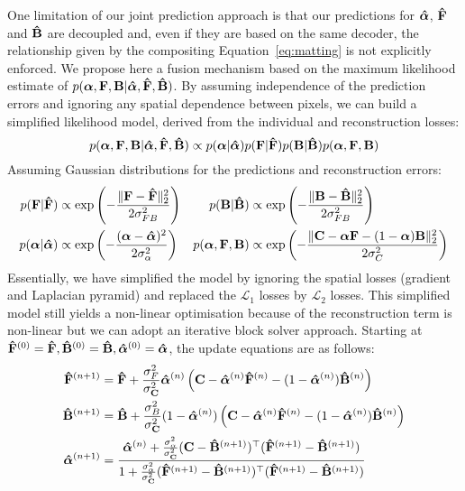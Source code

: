 \documentclass[runningheads]{llncs}
\begin{document}
One limitation of our joint prediction approach is that our predictions for
$\bm{\hat{\alpha}}$, $\mathbf{\hat{{F}}}$ and $\mathbf{\hat{{B}}}$ are decoupled and, even if they are based on the same
decoder, the relationship given by the compositing Equation~\ref{eq:matting} is
not explicitly enforced. We propose here a fusion mechanism based on the maximum
likelihood estimate of $p(\bm{{\alpha}}, \mathbf{{{F}}}, \mathbf{{{B}}} | \bm{\hat{\alpha}}, \mathbf{\hat{{F}}}, \mathbf{\hat{{B}}})$. By
assuming independence of the prediction errors and ignoring any spatial
dependence between pixels, we can build a simplified likelihood model, derived
from the individual and reconstruction losses:
\begin{equation}
p(\bm{{\alpha}}, \mathbf{{{F}}}, \mathbf{{{B}}} | \bm{\hat{\alpha}}, \mathbf{\hat{{F}}}, \mathbf{\hat{{B}}}) \propto p(\bm{{\alpha}}| \bm{\hat{\alpha}})p(\mathbf{{{F}}} |
\mathbf{\hat{{F}}})p(\mathbf{{{B}}} | \mathbf{\hat{{B}}})p(\bm{{\alpha}},\mathbf{{{F}}}, \mathbf{{{B}}})
\end{equation}
Assuming Gaussian distributions for the predictions and reconstruction errors:
{ \small
\begin{align*}
 p(\mathbf{{{F}}} | \mathbf{\hat{{F}}}) &\propto \exp\left(-\frac{\|\mathbf{{{F}}} - \mathbf{\hat{{F}}} \|_2^2}{2\sigma_{FB}^2} \right)  &
                                                                                         p(\mathbf{{{B}}} | \mathbf{\hat{{B}}}) &\propto\exp\left( -\frac{\|\mathbf{{{B}}} - \mathbf{\hat{{B}}} \|_2^2}{2\sigma_{FB}^2}
                                                                                                           \right) \\
 p(\bm{{\alpha}} | \bm{\hat{\alpha}}) &\propto \exp\left( -\frac{(\bm{{\alpha}} - \bm{\hat{\alpha}} )^2}{2\sigma_\alpha^2} \right)  &
 p(\bm{{\alpha}} , \mathbf{{{F}}}, \mathbf{{{B}}}) &\propto \exp\left( -\frac{\|\mathbf{C} -  \bm{{\alpha}}\mathbf{{{F}}} - (1-\bm{{\alpha}})\mathbf{{{B}}} \|_2^2}{2\sigma_{C}^2}\right) \\\end{align*}}
Essentially, we have simplified the model by ignoring the spatial losses
(gradient and Laplacian pyramid) and replaced the $\mathcal{L}_1$ losses by $\mathcal{L}_2$ losses.
This simplified model still yields a non-linear optimisation because of the
reconstruction term is non-linear but we can adopt an iterative block solver
approach.  Starting at $\mathbf{\hat{{F}}}^{(0)}=\mathbf{\hat{{F}}},\mathbf{\hat{{B}}}^{(0)}=\mathbf{\hat{{B}}},\bm{\hat{\alpha}}^{(0)}=\bm{\hat{\alpha}}$, the
update equations are as follows:
\begin{align}
  \mathbf{\hat{{F}}}^{(n+1)} &= \mathbf{\hat{{F}}} +
  \frac{\sigma_F^2}{\sigma_{\mathbf{C}}^2} \bm{\hat{\alpha}}^{(n)} \left( \mathbf{C} - \bm{\hat{\alpha}}^{(n)} \mathbf{\hat{{F}}}^{(n)} - (1-\bm{\hat{\alpha}}^{(n)})\mathbf{\hat{{B}}}^{(n)} \right) \\
  \mathbf{\hat{{B}}}^{(n+1)} &= \mathbf{\hat{{B}}} + \frac{\sigma_B^2}{\sigma_{\mathbf{C}}^2}
  (1-\bm{\hat{\alpha}}^{(n)})\left(\mathbf{C} -  \bm{\hat{\alpha}}^{(n)} \mathbf{\hat{{F}}}^{(n)} - (1-\bm{\hat{\alpha}}^{(n)})\mathbf{\hat{{B}}}^{(n)} \right) \\
  \bm{\hat{\alpha}}^{(n+1)} &= \frac{\bm{\hat{\alpha}}^{(n)} + \frac{\sigma_\alpha^2}{\sigma_{\mathbf{C}}^2}
    (\mathbf{C}-\mathbf{\hat{{B}}}^{(n+1)})^{\top}(\mathbf{\hat{{F}}}^{(n+1)}-\mathbf{\hat{{B}}}^{(n+1)}) }{1 + \frac{\sigma_\alpha^2}{\sigma_{\mathbf{C}}^2}
    (\mathbf{\hat{{F}}}^{(n+1)}-\mathbf{\hat{{B}}}^{(n+1)})^{\top}(\mathbf{\hat{{F}}}^{(n+1)}-\mathbf{\hat{{B}}}^{(n+1)}) } 
\end{align}
\end{document}
